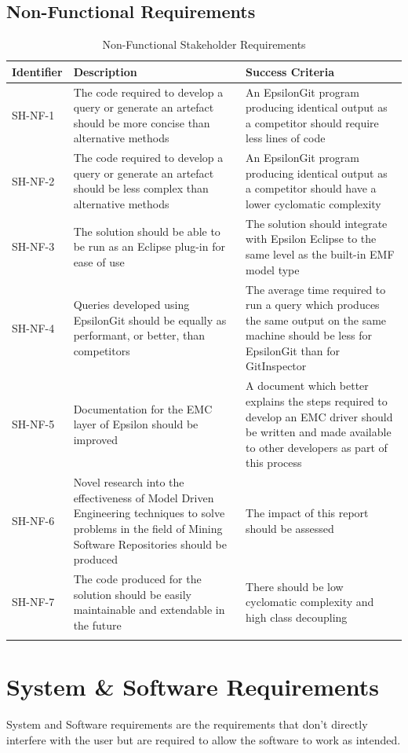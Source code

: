 \documentclass[11pt]{book}
\begin{document}
\subsection{Non-Functional Requirements}
\begin{longtable}{|p{2cm}|p{7cm}|p{6cm}|}
\hline
\textbf{Identifier} & \textbf{Description} & \textbf{Success Criteria} \\ \hline
SH-NF-1 & The code required to develop a query or generate an artefact should be more concise than alternative methods & An EpsilonGit program producing identical output as a competitor should require less lines of code \\ \hline
SH-NF-2 & The code required to develop a query or generate an artefact should be less complex than alternative methods & An EpsilonGit program producing identical output as a competitor should have a lower cyclomatic complexity \\ \hline
SH-NF-3 & The solution should be able to be run as an Eclipse plug-in for ease of use & The solution should integrate with Epsilon Eclipse to the same level as the built-in EMF model type \\ \hline
SH-NF-4 & Queries developed using EpsilonGit should be equally as performant, or better, than competitors & The average time required to run a query which produces the same output on the same machine should be less for EpsilonGit than for GitInspector \\ \hline
SH-NF-5 & Documentation for the EMC layer of Epsilon should be improved & A document which better explains the steps required to develop an EMC driver should be written and made available to other developers as part of this process \\ \hline
SH-NF-6 & Novel research into the effectiveness of Model Driven Engineering techniques to solve problems in the field of Mining Software Repositories should be produced & The impact of this report should be assessed \\ \hline
SH-NF-7 & The code produced for the solution should be easily maintainable and extendable in the future & There should be low cyclomatic complexity and high class decoupling \\ \hline
\caption{Non-Functional Stakeholder Requirements}
\label{tab:nonfunctionalstakeholderrequirements}
\end{longtable}

\section{System \& Software Requirements}
System and Software requirements are the requirements that don't directly interfere with the user but are required to allow the software to work as intended.
\end{document}
